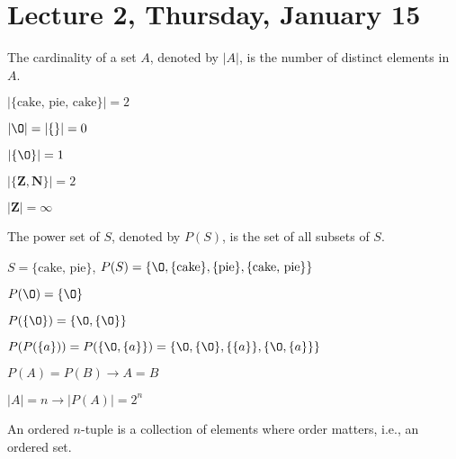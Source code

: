 \section{Lecture 2, Thursday, January 15}

\begin{defn}

The cardinality of a set $A$, denoted by $|A|$, is the number of distinct elements in $A$.

\end{defn}

\begin{ex}
$|\{\text{cake, pie, cake}\}| = 2$
\end{ex}
\begin{ex}
$|\O| = |\{\}| = 0$
\end{ex}
\begin{ex}
$|\{\O\}| = 1$
\end{ex}
\begin{ex}
$|\{\mathbf{Z}, \mathbf{N}\}| = 2$
\end{ex}
\begin{ex}
$|\mathbf{Z}| = \infty$
\end{ex}
\begin{defn}

The power set of $S$, denoted by $P(S)$, is the set of all subsets of $S$.

\end{defn}

\begin{ex}
$S = \{\text{cake, pie}\}$, $P(S) = \{ \O, \{\text{cake}\}, \{\text{pie}\}, \{\text{cake, pie}\} \}$
\end{ex}

\begin{ex}
$P(\O) = \{ \O \}$
\end{ex}

\begin{ex}
$P(\{ \O \}) = \{ \O, \{ \O \} \}$
\end{ex}

\begin{ex}
$P(P(\{a\})) = P(\{ \O, \{ a \} \}) = \{ \O, \{ \O \}, \{ \{ a \} \}, \{ \O, \{ a \} \} \}$
\end{ex}

$P(A) = P(B) \rightarrow A = B$

$|A| = n \rightarrow |P(A)| = 2^n$


\begin{defn}
An ordered $n$-tuple is a collection of elements where order matters, i.e., an ordered set.
\end{defn}

